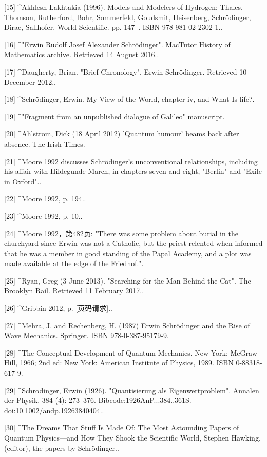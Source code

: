 [15]
^Akhlesh Lakhtakia (1996). Models and Modelers of Hydrogen: Thales, Thomson, Rutherford, Bohr, Sommerfeld, Goudsmit, Heisenberg, Schrödinger, Dirac, Sallhofer. World Scientific. pp. 147–. ISBN 978-981-02-2302-1..

[16]
^"Erwin Rudolf Josef Alexander Schrödinger". MacTutor History of Mathematics archive. Retrieved 14 August 2016..

[17]
^Daugherty, Brian. "Brief Chronology". Erwin Schrödinger. Retrieved 10 December 2012..

[18]
^Schrödinger, Erwin. My View of the World, chapter iv, and What Is life?.

[19]
^"Fragment from an unpublished dialogue of Galileo" manuscript.

[20]
^Ahlstrom, Dick (18 April 2012) 'Quantum humour' beams back after absence. The Irish Times.

[21]
^Moore 1992 discusses Schrödinger's unconventional relationships, including his affair with Hildegunde March, in chapters seven and eight, "Berlin" and "Exile in Oxford"..

[22]
^Moore 1992, p. 194..

[23]
^Moore 1992, p. 10..

[24]
^Moore 1992，第482页: "There was some problem about burial in the churchyard since Erwin was not a Catholic, but the priest relented when informed that he was a member in good standing of the Papal Academy, and a plot was made available at the edge of the Friedhof.".

[25]
^Ryan, Greg (3 June 2013). "Searching for the Man Behind the Cat". The Brooklyn Rail. Retrieved 11 February 2017..

[26]
^Gribbin 2012, p. [页码请求]..

[27]
^Mehra, J. and Rechenberg, H. (1987) Erwin Schrödinger and the Rise of Wave Mechanics. Springer. ISBN 978-0-387-95179-9.

[28]
^The Conceptual Development of Quantum Mechanics. New York: McGraw-Hill, 1966; 2nd ed: New York: American Institute of Physics, 1989. ISBN 0-88318-617-9.

[29]
^Schrodinger, Erwin (1926). "Quantisierung als Eigenwertproblem". Annalen der Physik. 384 (4): 273–376. Bibcode:1926AnP...384..361S. doi:10.1002/andp.19263840404..

[30]
^The Dreams That Stuff Is Made Of: The Most Astounding Papers of Quantum Physics—and How They Shook the Scientific World, Stephen Hawking, (editor), the papers by Schrödinger..

